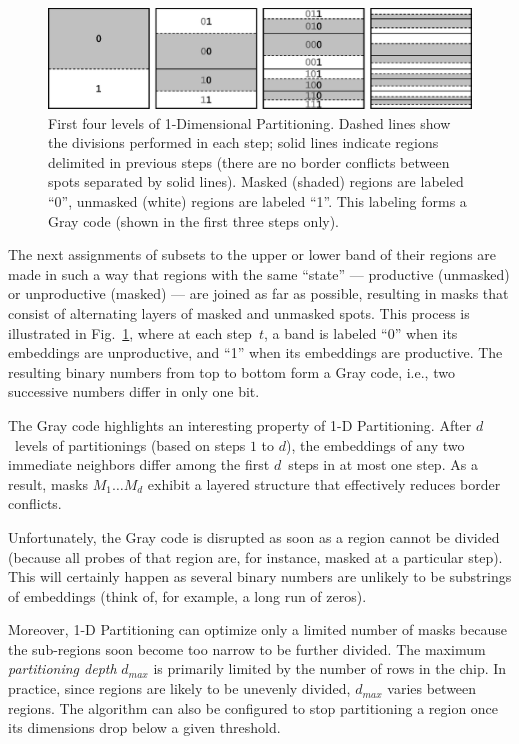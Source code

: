 \documentclass{w-edbk}
\begin{document}
\begin{figure}\centering
\includegraphics[width=\textwidth]{figures/1dpart.eps}
\caption{\label{fig:1dpart}%
  First four levels of 1-Dimensional Partitioning. Dashed lines show the
  divisions performed in each step; solid lines indicate regions delimited in
  previous steps (there are no border conflicts between spots separated by
  solid lines). Masked (shaded) regions are labeled ``0'',
  unmasked (white) regions are labeled ``1''. This labeling forms
  a Gray code (shown in the first three steps only).}
\end{figure}

The next assignments of subsets to the upper or lower band of their regions
are made in such a way that regions with the same ``state'' --- productive
(unmasked) or unproductive (masked) --- are joined as far as
possible, resulting in masks that consist of alternating layers of masked and
unmasked spots. This process is illustrated in Fig.~\ref{fig:1dpart}, where at
each step~$t$, a band is labeled ``0'' when its embeddings are unproductive,
and ``1'' when its embeddings are productive. The resulting binary numbers
from top to bottom form a Gray code, i.e., two successive numbers differ in
only one bit.

The Gray code highlights an interesting property of 1-D Partitioning.
After $d$~levels of partitionings (based on steps $1$ to $d$), the
embeddings of any two immediate neighbors differ among the first
$d$~steps in at most one step.  As a result, masks $M_1 \dots M_d$
exhibit a layered structure that effectively reduces border conflicts.

Unfortunately, the Gray code is disrupted as soon as a region cannot be divided
(because all probes of that region are, for instance, masked at a particular
step). This will certainly happen as several binary numbers are unlikely to be
substrings of embeddings (think of, for example, a long run of zeros).

Moreover, 1-D Partitioning can optimize only a limited number of masks
because the sub-regions soon become too narrow to be further divided. The
maximum \emph{partitioning depth} $d_{max}$ is primarily limited by the number
of rows in the chip. In practice, since regions are likely to be unevenly
divided, $d_{max}$ varies between regions. The algorithm can also be configured
to stop partitioning a region once its dimensions drop below a given threshold.
\end{document}
